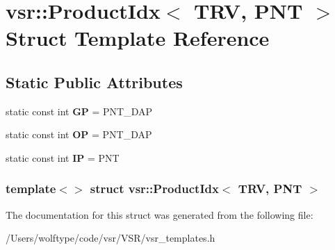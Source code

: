 \hypertarget{structvsr_1_1_product_idx_3_01_t_r_v_00_01_p_n_t_01_4}{\section{vsr\-:\-:Product\-Idx$<$ T\-R\-V, P\-N\-T $>$ Struct Template Reference}
\label{structvsr_1_1_product_idx_3_01_t_r_v_00_01_p_n_t_01_4}
}
\subsection*{Static Public Attributes}
\begin{DoxyCompactItemize}
\item 
\hypertarget{structvsr_1_1_product_idx_3_01_t_r_v_00_01_p_n_t_01_4_afe86e47bca094b54c89a0aed3bb5bd40}{static const int {\bfseries G\-P} = P\-N\-T\-\_\-\-D\-A\-P}\label{structvsr_1_1_product_idx_3_01_t_r_v_00_01_p_n_t_01_4_afe86e47bca094b54c89a0aed3bb5bd40}

\item 
\hypertarget{structvsr_1_1_product_idx_3_01_t_r_v_00_01_p_n_t_01_4_a2f2a630422c24e171dd44f3e07607dbe}{static const int {\bfseries O\-P} = P\-N\-T\-\_\-\-D\-A\-P}\label{structvsr_1_1_product_idx_3_01_t_r_v_00_01_p_n_t_01_4_a2f2a630422c24e171dd44f3e07607dbe}

\item 
\hypertarget{structvsr_1_1_product_idx_3_01_t_r_v_00_01_p_n_t_01_4_a6a4117674759446145695d6ce2828001}{static const int {\bfseries I\-P} = P\-N\-T}\label{structvsr_1_1_product_idx_3_01_t_r_v_00_01_p_n_t_01_4_a6a4117674759446145695d6ce2828001}

\end{DoxyCompactItemize}
\subsubsection*{template$<$$>$ struct vsr\-::\-Product\-Idx$<$ T\-R\-V, P\-N\-T $>$}



The documentation for this struct was generated from the following file\-:\begin{DoxyCompactItemize}
\item 
/\-Users/wolftype/code/vsr/\-V\-S\-R/vsr\-\_\-templates.\-h\end{DoxyCompactItemize}
